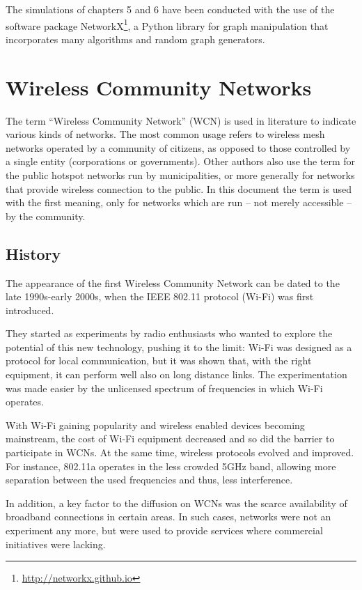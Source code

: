 \documentclass[a4paper,11pt,twoside,openleft]{memoir}
\begin{document}
The simulations of chapters 5 and 6 have been conducted with the use of the
software package NetworkX\footnote{\url{http://networkx.github.io}}, a Python
library for graph manipulation that incorporates many algorithms and random
graph generators.

\chapter{Wireless Community Networks}\label{wireless-community-networks}

The term ``Wireless Community Network'' (WCN) is used in literature to
indicate various kinds of networks. The most common usage refers to
wireless mesh networks operated by a community of citizens, as opposed
to those controlled by a single entity (corporations or governments).
Other authors also use the term for the public hotspot networks run by
municipalities, or more generally for networks that provide wireless
connection to the public. In this document the term is used with the
first meaning, only for networks which are run -- not merely accessible
-- by the community.


\section{History}\label{history}

The appearance of the first Wireless Community Network can be dated to
the late 1990s-early 2000s, when the IEEE 802.11 protocol (Wi-Fi) was
first introduced.

They started as experiments by radio enthusiasts who
wanted to explore the potential of this new technology, pushing it to
the limit: Wi-Fi was designed as a protocol for local communication, but
it was shown that, with the right equipment, it can perform well also on
long distance links. The experimentation was made easier by the
unlicensed spectrum of frequencies in which Wi-Fi operates.

With Wi-Fi gaining popularity and wireless enabled devices becoming
mainstream, the cost of Wi-Fi equipment decreased and so did the barrier
to participate in WCNs. At the same time, wireless protocols evolved and
improved. For instance, 802.11a operates in the less crowded 5GHz band,
allowing more separation between the used frequencies and thus, less
interference.

In addition, a key factor to the diffusion on WCNs was the
scarce availability of broadband connections in certain areas. In such
cases, networks were not an experiment any more, but were used to provide
services where commercial initiatives were lacking.
\end{document}
